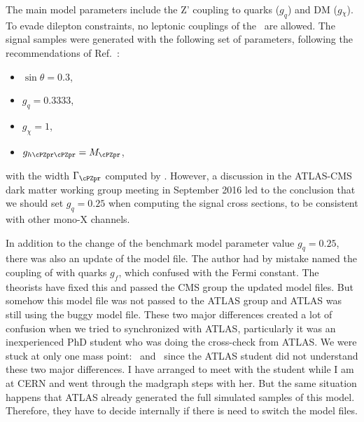 The main model parameters include the Z' coupling to quarks ($g_q$) and DM 
($g{_\chi}$). To evade dilepton constraints, no leptonic couplings 
of the \cPZpr\ are allowed. The signal samples were generated with the 
following set of parameters, following the recommendations of 
Ref.~\cite{Abercrombie:2015wmb}:
\begin{itemize}
\item $\sin\theta=0.3$,
\item $g_q=0.3333$,
\item $g_{\chi}=1$,
\item $g_{h\cPZpr\cPZpr}=M_{\cPZpr}$,
\end{itemize}
with the width $\Gamma_{\cPZpr}$ computed by \MADGRAPH.
However, a discussion in the ATLAS-CMS dark matter working group meeting in 
September 2016 led to the conclusion that we should set $g_q=0.25$ when 
computing the signal cross sections, to be consistent with other mono-X channels. 

In addition to the change of the benchmark model parameter value $g_q=0.25$, there was also an update 
of the model file. The author had by mistake named the coupling of \cPZpr with quarks $g_f$, which 
confused \MADGRAPH with the Fermi constant. The theorists have fixed this and passed the CMS group 
the updated model files. But somehow this model file was not passed to the ATLAS group and ATLAS was 
still using the buggy model file. These two major differences created a lot of confusion when we 
tried to synchronized with ATLAS, particularly it was an inexperienced PhD student who was doing the 
cross-check from ATLAS. We were stuck at only one mass point: ~\GeV and ~\GeV since the 
ATLAS student did not understand these two major differences. I have arranged to meet with the student 
while I am at CERN and went through the madgraph steps with her. But the same situation happens that 
ATLAS already generated the full simulated samples of this model. Therefore, they have to decide 
internally if there is need to switch the model files.

